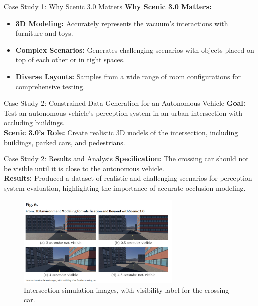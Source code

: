 \documentclass{beamer}
\begin{document}
\begin{frame}{Case Study 1: Why Scenic 3.0 Matters}
  \textbf{Why Scenic 3.0 Matters:}
  \begin{itemize}
    \setlength{\itemindent}{-1em} 
\item \textbf{3D Modeling:} Accurately represents the vacuum's interactions with furniture and toys.
\item \textbf{Complex Scenarios:} Generates challenging scenarios with objects placed on top of each other or in tight spaces.
\item \textbf{Diverse Layouts:} Samples from a wide range of room configurations for comprehensive testing.
\end{itemize}
\end{frame}


\begin{frame}{Case Study 2: Constrained Data Generation for an Autonomous Vehicle}
\textbf{Goal:} Test an autonomous vehicle's perception system in an urban intersection with occluding buildings.\\
\textbf{Scenic 3.0's Role:} Create realistic 3D models of the intersection, including buildings, parked cars, and pedestrians.
\end{frame}


\begin{frame}{Case Study 2: Results and Analysis}
  \textbf{Specification:} The crossing car should not be visible until it is close to the autonomous vehicle.\\
\textbf{Results:} Produced a dataset of realistic and challenging scenarios for perception system evaluation, highlighting the importance of accurate occlusion modeling.

\begin{figure}
\centering
\includegraphics[width=0.7\textwidth]{FIG6.png}
\caption{Intersection simulation images, with visibility label for the crossing car.}
\label{fig:intersection}
\end{figure}
\end{frame}
\end{document}

